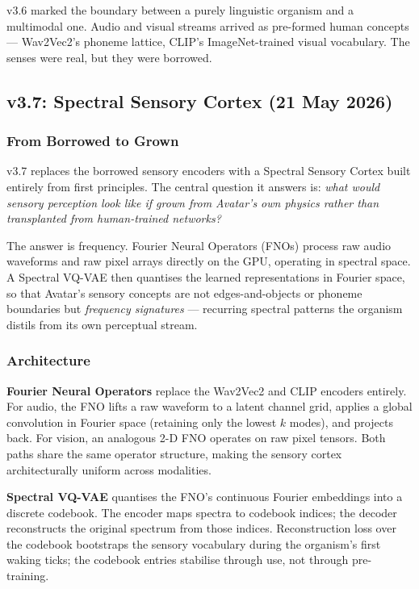 \documentclass[11pt,a4paper]{article}
\begin{document}
\begin{tcolorbox}[callout,title={v3.6 Significance}]
v3.6 marked the boundary between a purely linguistic organism and a multimodal one.
Audio and visual streams arrived as pre-formed human concepts --- Wav2Vec2's phoneme
lattice, CLIP's ImageNet-trained visual vocabulary. The senses were real, but they
were borrowed.
\end{tcolorbox}

\subsection{v3.7: Spectral Sensory Cortex (21 May 2026)}

\subsubsection{From Borrowed to Grown}

v3.7 replaces the borrowed sensory encoders with a Spectral Sensory Cortex built
entirely from first principles. The central question it answers is: \emph{what
would sensory perception look like if grown from Avatar's own physics rather than
transplanted from human-trained networks?}

The answer is frequency. Fourier Neural Operators (FNOs) process raw audio
waveforms and raw pixel arrays directly on the GPU, operating in spectral space.
A Spectral VQ-VAE then quantises the learned representations in Fourier space,
so that Avatar's sensory concepts are not edges-and-objects or phoneme boundaries
but \emph{frequency signatures} --- recurring spectral patterns the organism
distils from its own perceptual stream.

\subsubsection{Architecture}

\textbf{Fourier Neural Operators} replace the Wav2Vec2 and CLIP encoders entirely.
For audio, the FNO lifts a raw waveform to a latent channel grid, applies a global
convolution in Fourier space (retaining only the lowest $k$ modes), and projects
back. For vision, an analogous 2-D FNO operates on raw pixel tensors. Both paths
share the same operator structure, making the sensory cortex architecturally
uniform across modalities.

\textbf{Spectral VQ-VAE} quantises the FNO's continuous Fourier embeddings into a
discrete codebook. The encoder maps spectra to codebook indices; the decoder
reconstructs the original spectrum from those indices. Reconstruction loss over
the codebook bootstraps the sensory vocabulary during the organism's first waking
ticks; the codebook entries stabilise through use, not through pre-training.
\end{document}
